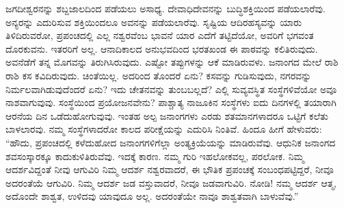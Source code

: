 ಜಗದೀಶ್ವರನನ್ನು ಶಬ್ದಜಾಲದಿಂದ ಪಡೆಯಲು ಅಸಾಧ್ಯ. ದೇವಾಧಿದೇವನನ್ನು ಬುದ್ಧಿಶಕ್ತಿಯಿಂದ ಪಡೆಯಲಾರೆವು. ಅನ್ಯರನ್ನು ಎದುರಿಸುವ ಶಕ್ತಿಯಿಂದಲೂ ಅವನನ್ನು ಪಡೆಯಲಾರೆವು. ಸೃಷ್ಟಿಯ ಆದಿರಹಸ್ಯವನ್ನು ಯಾರು ತಿಳಿದಿರುವರೋ, ಪ್ರಪಂಚದಲ್ಲಿ ಎಲ್ಲ ನಶ್ವರವೆಂಬ ಭಾವನೆ ಯಾರ ಎದೆಗೆ ತಟ್ಟಿದೆಯೋ, ಅವರಿಗೆ ಭಗವಂತ ದೊರಕುವನು. ಇತರರಿಗೆ ಅಲ್ಲ. ಆನಾದಿಕಾಲದ ಅನುಭವದಿಂದ ಭರತಖಂಡ ಈ ಪಾಠವನ್ನು ಕಲಿತಿರುವುದು. ಅವನೆಡೆಗೆ ತನ್ನ ಮೊಗವನ್ನು ತಿರುಗಿಸಿರುವುದು. ಎಷ್ಟೋ ತಪ್ಪುಗಳನ್ನು ಆಕೆ ಮಾಡಿರುವಳು. ಜನಾಂಗದ ಮೇಲೆ ರಾಶಿ ರಾಶಿ ಕಸ ಕವಿದಿರುವುದು. ಚಿಂತೆಯಿಲ್ಲ. ಅದರಿಂದ ತೊಂದರೆ ಏನು? ಕಸವನ್ನು ಗುಡಿಸುವುದು, ನಗರವನ್ನು ನಿರ್ಮಲವಾಗಿಡುವುದೆಂದರೆ ಏನು? ಇದು ಚೇತನವನ್ನು ತುಂಬಬಲ್ಲದೆ? ಎಲ್ಲಿ ಸುವ್ಯವಸ್ಥಿತ ಸಂಸ್ಥೆಗಳಿವೆಯೋ ಅವೂ ನಾಶವಾಗುವುವು. ಸಂಸ್ಥೆಯಿಂದ ಪ್ರಯೋಜನವೇನು? ಪಾಶ್ಚಾತ್ಯ ನಾಜೂಕಿನ ಸಂಸ್ಥೆಗಳು ಐದು ದಿನಗಳಲ್ಲಿ ತಯಾರಾಗಿ ಆರನೆಯ ದಿನ ಒಡೆದುಹೋಗುವುವು. ಇಂತಹ ಅಲ್ಪ ಜನಾಂಗಗಳು ಎರಡು ಶತಮಾನಗಳಾದರೂ ಒಟ್ಟಿಗೆ ಕಲೆತು ಬಾಳಲಾರವು. ನಮ್ಮ ಸಂಸ್ಥೆಗಳಾದರೋ ಕಾಲದ ಪರೀಕ್ಷೆಯನ್ನು ಎದುರಿಸಿ ನಿಂತಿವೆ. ಹಿಂದೂ ಹೀಗೆ ಹೇಳುವರು: “ಹೌದು, ಪ್ರಪಂಚದಲ್ಲಿ ಕಳೆದುಹೋದ ಜನಾಂಗಗಳಿಗೆಲ್ಲಾ ಅಂತ್ಯಕ್ರಿಯೆಯನ್ನು ಮಾಡಿರುವೆವು. ಆಧುನಿಕ ಜನಾಂಗದ ಶವಸಂಸ್ಕಾರಕ್ಕೂ ಕಾದುಕುಳಿತಿರುವೆವು. ಇದಕ್ಕೆ ಕಾರಣ. ನಮ್ಮ ಗುರಿ ಇಹಲೋಕವಲ್ಲ, ಪರಲೋಕ. ನಿಮ್ಮ ಆದರ್ಶವಿದ್ದಂತೆ ನೀವು ಆಗುವಿರಿ ನಿಮ್ಮ ಆದರ್ಶ ನಶ್ವರವಾದರೆ, ಈ ಭೌತಿಕ ಪ್ರಪಂಚಕ್ಕೆ ಸಂಬಂಧಪಟ್ಟಿದ್ದರೆ, ನೀವೂ ಅದರಂತೆಯೆ ಆಗುವಿರಿ. ನಿಮ್ಮ ಆದರ್ಶ ಜಡ ವಸ್ತುವಾದರೆ, ನೀವೂ ಜಡವಾಗುವಿರಿ. ನೋಡಿ! ನಮ್ಮ ಆದರ್ಶ ಆತ್ಮ, ಅದೊಂದೇ ಶಾಶ್ವತ, ಉಳಿದವು ಯಾವುದೂ ಅಲ್ಲ. ಅದರಂತೆಯೇ ನಾವೂ ಶಾಶ್ವತವಾಗಿ ಬಾಳುವೆವು.”

